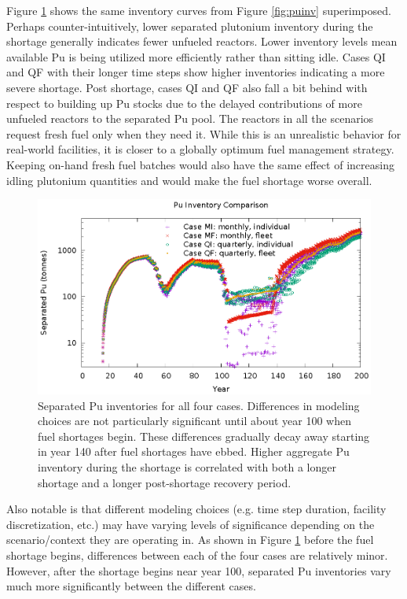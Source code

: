 \documentclass{style}
\begin{document}
Figure \ref{fig:puinv-compare} shows the same inventory curves from Figure
\ref{fig:puinv} superimposed. Perhaps counter-intuitively, lower separated plutonium
inventory during the shortage generally indicates fewer unfueled reactors.
Lower inventory levels mean available Pu is being utilized more efficiently
rather than sitting idle.  Cases QI and QF with their longer time steps show
higher inventories indicating a more severe shortage.  Post shortage, cases QI and QF
also fall a bit behind with respect to building up Pu stocks due to the delayed
contributions of more unfueled reactors to the separated Pu pool.  The
reactors in all the scenarios request fresh fuel only when they need it. While
this is an unrealistic behavior for real-world facilities, it is closer to a
globally optimum fuel management strategy.  Keeping on-hand fresh fuel batches
would also have the same effect of increasing idling plutonium quantities and
would make the fuel shortage worse overall.

\begin{figure}[!h]
    \centering
    \includegraphics[width=1.0\textwidth]{exp2/puinv-compare.eps}
    \caption{
        Separated Pu inventories for all four cases.  Differences in modeling
        choices are not particularly significant until about year 100 when
        fuel shortages begin.  These differences gradually decay away starting
        in year 140 after fuel shortages have ebbed.  Higher aggregate Pu
        inventory  during the shortage is correlated with both a longer shortage and
        a longer post-shortage recovery period.
    }
    \label{fig:puinv-compare}
\end{figure}

Also notable is that different modeling choices (e.g. time step duration,
facility discretization, etc.) may have varying levels of significance
depending on the scenario/context they are operating in.  As shown in Figure
\ref{fig:puinv-compare} before the fuel shortage begins, differences between
each of the four cases are relatively minor.  However, after the shortage
begins near year 100, separated Pu inventories vary much more significantly
between the different cases.
\end{document}
